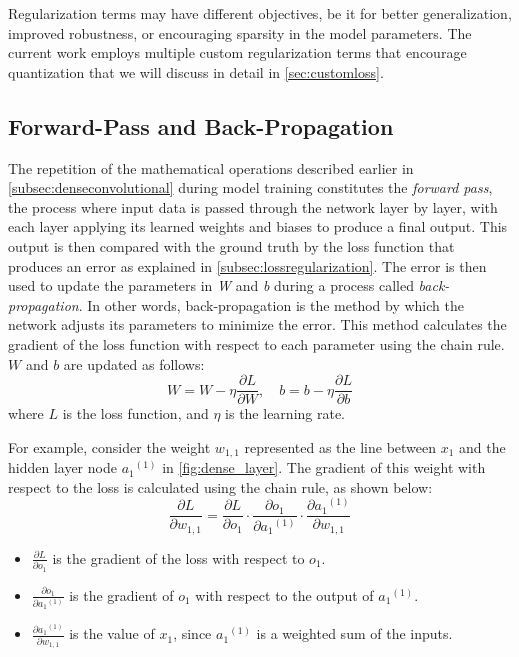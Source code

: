 Regularization terms may have different objectives, be it for better generalization, 
improved robustness, or encouraging sparsity in the model parameters. 
The current work employs multiple custom regularization terms 
that encourage quantization that we will discuss in detail in \cref{sec:customloss}.


\subsection{Forward-Pass and Back-Propagation}
\label{subsec:forwardback}
\hspace*{1em} The repetition of the mathematical operations described earlier in \cref{subsec:denseconvolutional} 
during model training constitutes the \textit{forward pass}, 
the process where input data is passed through the network layer by layer, 
with each layer applying its learned weights and biases to produce a final output. 
This output is then compared with the ground truth by the loss function that produces an error
as explained in \cref{subsec:lossregularization}.
The error is then used to update the parameters in \textit{W} and \textit{b} during a process called \textit{back-propagation}.
In other words, back-propagation is the method by which the network adjusts its parameters to minimize the error. 
This method calculates the gradient of the loss function with respect to each parameter using the chain rule. 
\( W \) and \( b \) are updated as follows:
\[
W = W - \eta \frac{\partial L}{\partial W}, \quad b = b - \eta \frac{\partial L}{\partial b}
\]
where \( L \) is the loss function, and \( \eta \) is the learning rate.

For example, consider the weight \( w_{1,1} \) represented as the line between \( x_1 \)
 and the hidden layer node \( {a_1}^{(1)} \) in \cref{fig:dense_layer}. 
The gradient of this weight with respect to the loss is calculated using the chain rule,
as shown below:
\[
\frac{\partial L}{\partial w_{1,1}} = \frac{\partial L}{\partial o_1} \cdot \frac{\partial o_1}{\partial {a_1}^{(1)}} \cdot \frac{\partial {a_1}^{(1)}}{\partial w_{1,1}}
\]
\begin{itemize}
    \item \( \frac{\partial L}{\partial o_1} \) is the gradient of the loss with respect to \( o_1 \).
    \item \( \frac{\partial o_1}{\partial {a_1}^{(1)}} \) is the gradient of \( o_1 \) with respect to the output of \( {a_1}^{(1)} \).
    \item \( \frac{\partial {a_1}^{(1)} }{\partial w_{1,1}} \) is the value of  \( x_1 \), since  \( {a_1}^{(1)} \) is a weighted sum of the inputs.
\end{itemize}

